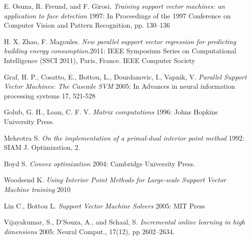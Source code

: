 \documentclass[12pt]{article}
\begin{document}
\begin{thebibliography}{}
E. Osuna, R. Freund, and F. Girosi. {\em Training support vector machines: an application to face detection} 1997: In Proceedings of the 1997 Conference on Computer Vision and Pattern Recognition, pp. 130–136

H. X. Zhao, F. Magoules. {\em New parallel support vector regression for predicting building energy consumption}.2011: IEEE Symposium Series on Computational Intelligence (SSCI 2011), Paris, France. IEEE Computer Society

  Graf, H. P., Cosatto, E., Bottou, L., Dourdanovic, I., Vapnik, V.  {\em Parallel Support Vector Machines: The Cascade SVM} 2005: In Advances in neural information processing systems 17, 521-528

 Golub, G. H., Loan, C. F. V. {\em Matrix computations} 1996: Johns Hopkins University Press.

   Mehrotra S.  {\em On the implementation of a primal-dual interior point method} 1992: SIAM J. Optimization, 2.

 Boyd S. {\em Convex optimization}  2004: Cambridge University Press.
  
  Woodsend K. {\em Using Interior Point Methods for Large-scale Support Vector Machine training} 2010
  
Lin C., Bottou L. {\em Support Vector Machine Solvers} 2005: MIT Press

Vijayakumar, S., D’Souza, A., and Schaal, S. {\em Incremental online learning in high dimensions} 2005: Neural Comput., 17(12), pp 2602–2634.


  \end{thebibliography}
 
\end{document}
